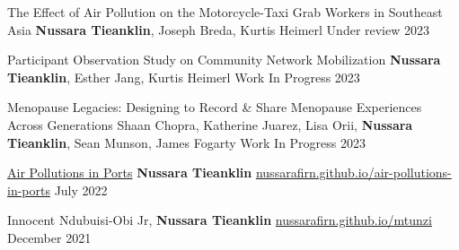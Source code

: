 

\begin{cventries}

\cvpub
    {The Effect of Air Pollution on the Motorcycle-Taxi Grab Workers in Southeast Asia} %
    {\textbf{Nussara Tieanklin}, Joseph Breda, Kurtis Heimerl} %
    {Under review} %
    {2023} %


\cvpub
    {Participant Observation Study on Community Network Mobilization} %
    {\textbf{Nussara Tieanklin}, Esther Jang, Kurtis Heimerl} %
    {Work In Progress} %
    {2023} %
   
   

\cvpub
    {Menopause Legacies: Designing to Record \& Share Menopause Experiences Across Generations} %
    {Shaan Chopra, Katherine Juarez, Lisa Orii, \textbf{Nussara Tieanklin}, Sean Munson, James Fogarty} %
    {Work In Progress} %
    {2023} %
   


\cvpub
      { \href{https://nussarafirn.github.io/air-pollutions-in-ports}{Air Pollutions in Ports}} %
    {\textbf{Nussara Tieanklin}} %
    { \href{https://nussarafirn.github.io/air-pollutions-in-ports}{nussarafirn.github.io/air-pollutions-in-ports}} %
    {July 2022} %

\cvpub
    {} %
    {Innocent Ndubuisi-Obi Jr, \textbf{Nussara Tieanklin}} %
    { \href{https://nussarafirn.github.io/mtunzi}{nussarafirn.github.io/mtunzi}} %
    {December 2021} %


\end{cventries}
